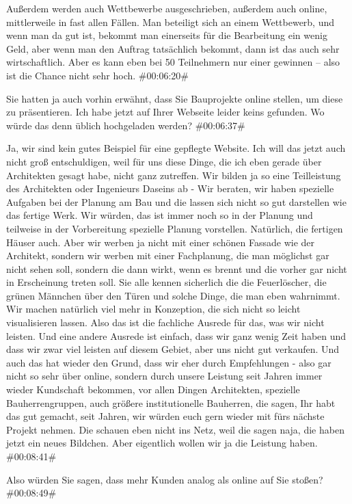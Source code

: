 \begin{description}
Außerdem werden auch Wettbewerbe ausgeschrieben, außerdem auch online, mittlerweile in fast allen Fällen. Man beteiligt sich an einem Wettbewerb, und wenn man da gut ist, bekommt man einerseits für die Bearbeitung ein wenig Geld, aber wenn man den Auftrag tatsächlich bekommt, dann ist das auch sehr wirtschaftlich. Aber es kann eben bei 50 Teilnehmern nur einer gewinnen – also ist die Chance nicht sehr hoch. \#00:06:20\#

\Fabian Sie hatten ja auch vorhin erwähnt, dass Sie Bauprojekte online stellen, um diese zu präsentieren. Ich habe jetzt auf Ihrer Webseite leider keins gefunden. Wo würde das denn üblich hochgeladen werden? \#00:06:37\#

\Andre Ja, wir sind kein gutes Beispiel für eine gepflegte Website. Ich will das jetzt auch nicht groß entschuldigen, weil für uns diese Dinge, die ich eben gerade über Architekten gesagt habe, nicht ganz zutreffen. Wir bilden ja so eine Teilleistung des Architekten oder Ingenieurs Daseins ab - Wir beraten, wir haben spezielle Aufgaben bei der Planung am Bau und die lassen sich nicht so gut darstellen wie das fertige Werk. Wir würden, das ist immer noch so in der Planung und teilweise in der Vorbereitung spezielle Planung vorstellen. Natürlich, die fertigen Häuser auch. Aber wir werben ja nicht mit einer schönen Fassade wie der Architekt, sondern wir werben mit einer Fachplanung, die man möglichst gar nicht sehen soll, sondern die dann wirkt, wenn es brennt und die vorher gar nicht in Erscheinung treten soll. Sie alle kennen sicherlich die die Feuerlöscher, die grünen Männchen über den Türen und solche Dinge, die man eben wahrnimmt. Wir machen natürlich viel mehr in Konzeption, die sich nicht so leicht visualisieren lassen. Also das ist die fachliche Ausrede für das, was wir nicht leisten. Und eine andere Ausrede ist einfach, dass wir ganz wenig Zeit haben und dass wir zwar viel leisten auf diesem Gebiet, aber uns nicht gut verkaufen. Und auch das hat wieder den Grund, dass wir eher durch Empfehlungen - also gar nicht so sehr über online, sondern durch unsere Leistung seit Jahren immer wieder Kundschaft bekommen, vor allen Dingen Architekten, spezielle Bauherrengruppen, auch größere institutionelle Bauherren, die sagen, Ihr habt das gut gemacht, seit Jahren, wir würden euch gern wieder mit fürs nächste Projekt nehmen. Die schauen eben nicht ins Netz, weil die sagen naja, die haben jetzt ein neues Bildchen. Aber eigentlich wollen wir ja die Leistung haben. \#00:08:41\#

\Fabian Also würden Sie sagen, dass mehr Kunden analog als online auf Sie stoßen? \#00:08:49\#


\end{description}
